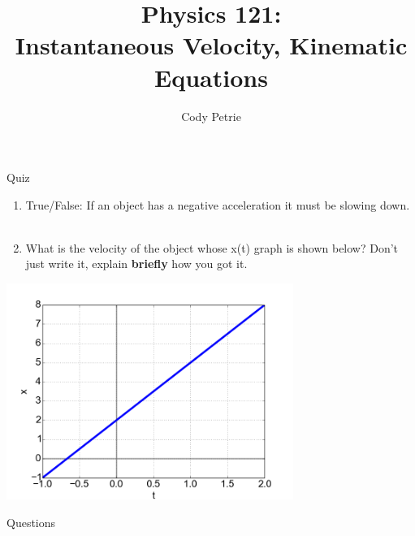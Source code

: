 \documentclass{beamer}
\title[{\color{white}{Chapters 2.2-4}}]{Physics 121: \\ Instantaneous Velocity, Kinematic Equations}
\author{Cody Petrie}
\institute{Mesa Community College}
\date{}
\begin{document}
\begin{frame}
\titlepage
\end{frame}



\begin{frame}{Quiz}
\begin{enumerate}
   \item True/False: If an object has a negative acceleration it must be slowing down. \\~\\
   \item What is the velocity of the object whose x(t) graph is shown below? Don't just write it, explain {\bf briefly} how you got it.
\end{enumerate}
\begin{center}
   \includegraphics[width=0.7\textwidth]{../figures/2_2-4Quiz.png}
\end{center}
\end{frame}

\begin{frame}{Questions}
\begin{center}
   \color{blue}{\Huge How is HW going?}
\end{center}
\end{frame}
\end{document}
